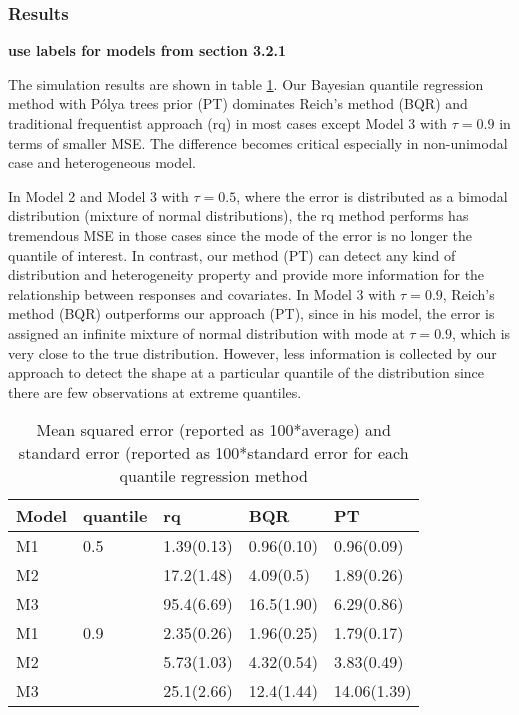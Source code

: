 \documentclass[12pt]{article}
\newcommand{\polya}{P\'{o}lya}
\begin{document}
\subsubsection{Results}

{\bf use labels for models from section 3.2.1}

  The simulation results are shown in table \ref{tab:1}. Our
  Bayesian quantile regression method with \polya{} trees prior (PT)
  dominates Reich's method (BQR) and traditional frequentist approach
  (rq) in most cases except Model 3 with $\tau = 0.9$ in terms of
  smaller MSE. The difference becomes critical especially in
  non-unimodal case and heterogeneous model. 

  In Model 2 and Model 3 with $\tau=0.5$, where the error is
  distributed as a bimodal distribution (mixture of normal
  distributions), the rq method performs has tremendous MSE in those
  cases  since the mode of the error is no longer the quantile of
  interest. In contrast, our method (PT) can detect any kind of
  distribution and heterogeneity property and provide more information
  for the relationship between responses and covariates. In Model 3
  with $\tau=0.9$, Reich's method (BQR) outperforms our approach (PT),
  since in his model, the error is assigned an infinite mixture of
  normal distribution with mode at $\tau=0.9$, which is very close to
  the true distribution. However, less information is collected by our
  approach to detect the shape at a particular quantile of the
  distribution since there are few observations at extreme quantiles. 

\begin{center}
\begin{table}[h]
\centering
\caption[]{ Mean squared error (reported as 100*average) and standard
  error (reported as 100*standard error for each
  quantile regression method}
\vspace{4mm}
\begin{tabular}[tb]{l|l|l|l|l}
\hline
Model & quantile & rq         & BQR        & PT          \\
\hline
M1    & 0.5      & 1.39(0.13) & 0.96(0.10) & 0.96(0.09)  \\
M2    &          & 17.2(1.48) & 4.09(0.5)  & 1.89(0.26)  \\
M3    &          & 95.4(6.69) & 16.5(1.90) & 6.29(0.86)  \\
\hline
M1    & 0.9      & 2.35(0.26) & 1.96(0.25) & 1.79(0.17)  \\
M2    &          & 5.73(1.03) & 4.32(0.54) & 3.83(0.49)  \\
M3    &          & 25.1(2.66) & 12.4(1.44) & 14.06(1.39) \\
\hline
\end{tabular}
\label{tab:1}
\end{table}
\end{center}
\end{document}
